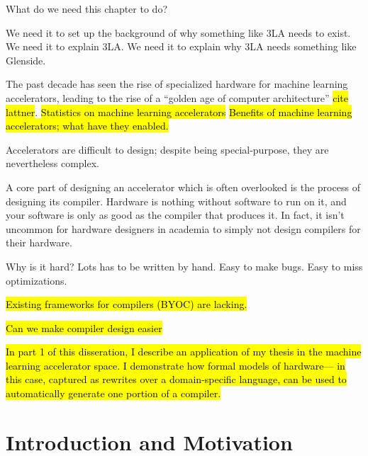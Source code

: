 What do we need this chapter to do?

We need it to set up the background of why something like 3LA needs to exist.
We need it to explain 3LA.
We need it to explain why 3LA needs something like Glenside.


The past decade has seen the rise
  of specialized hardware
  for
  machine learning accelerators,
  leading to the rise of a
  ``golden age of computer architecture''
  \hl{cite lattner}.
\hl{Statistics on machine learning accelerators}
\hl{Benefits of machine learning
  accelerators; what have they
  enabled.}

Accelerators are difficult to design;
  despite being special-purpose,
  they are nevertheless complex.

A core part of designing an accelerator
  which is often overlooked
  is the process of designing its compiler.
Hardware is nothing
  without software to run on it,
  and your software is only as good as the compiler
  that produces it.
In fact, it isn't uncommon
  for hardware designers in academia
  to simply not design compilers
  for their hardware.

Why is it hard?
Lots has to be written by hand.
Easy to make bugs.
Easy to miss optimizations.

\hl{Existing frameworks for compilers (BYOC) are lacking.}

\hl{Can we make compiler design easier}


\hl{
In part 1 of this disseration,
  I describe an application
  of my thesis
  in the machine learning accelerator space.
I demonstrate how
  formal models of hardware---%
  in this case, captured as rewrites
  over a domain-specific language,
  can be used to automatically generate
  one portion of a compiler.
}


\chapter{Introduction and Motivation}
\label{sec:part1-motivation}




